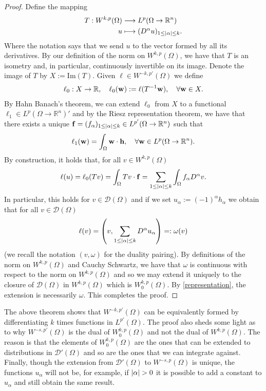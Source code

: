 \documentclass[
    a4paper,
    DIV=14,
    abstract=true,
    numbers=noenddot
]
{scrartcl}
\theoremstyle{definition}
\newcommand{\rm}[1]{\mathrm{#1}}
\newcommand{\R}{\mathbb{R}}
\newcommand{\Dd}{\mathcal{D}}
\begin{document}
\begin{proof}
  Define the mapping
  \begin{align*}
    T: W^{k,p}(\Omega ) & \longrightarrow L^p(\Omega \to \R^n)                \\
    u                   & \longmapsto(D^\alpha u)_{1 \leq\abs{\alpha}\leq k}.
  \end{align*}
  Where the notation says that we send $u$ to the vector formed by all its derivatives. By our definition of the norm on $W^{k,p}(\Omega )$, we have that $T$ is an isometry and, in particular, continuously invertible on its image. Denote the image of $T$ by $X:=\rm{Im}(T)$. Given $\ell \in W^{-k,p'}(\Omega )$ we define
  \begin{align*}
    \ell_0: X \to \R, \quad \ell_0(\vb{w}):= \ell(T^{-1}\vb{w}), \quad \forall \vb{w} \in X.
  \end{align*}
  By Hahn Banach's theorem, we can extend $\ell_0$ from $X$ to a functional $\ell_1 \in  L^p(\Omega \to \R^n)'$ and by the Riesz representation theorem, we have that there exists a unique $\vb{f}=(f_\alpha)_{1\leq \abs{\alpha}\leq k }\in L^{p'}(\Omega \to \R^n)$ such that
  \begin{align*}
    \ell_1(\vb{w})=\int_{\Omega}\vb{w}\cdot \vb{h}, \quad \forall \vb{w} \in L^p(\Omega \to \R^n).
  \end{align*}
  By construction, it holds that, for all $v \in W^{k,p}(\Omega )$
  \begin{align*}
    \ell(u)=\ell_0(Tv)=\int_{\Omega}Tv\cdot \vb{f}=\sum_{1\leq\left| \alpha \right|\leq k}\int_{\Omega}f_\alpha D^\alpha v .
  \end{align*}
  In particular, this holds for $v \in \Dd(\Omega )$ and if we set $u_\alpha:=(-1)^\alpha h_\alpha$ we obtain that for all $v \in \Dd(\Omega )$
  \begin{align}\label{representation}
    \ell(v)=\left(v,\sum_{1\leq\left| \alpha \right|\leq k} D^\alpha u_\alpha\right)=: \omega(v)
  \end{align}
  (we recall the notation $(v,\omega)$ for the duality pairing). By definitions of the norm on $W^{k,p}(\Omega )$ and Cauchy Schwartz, we have that $\omega$ is continuous with respect to the norm on $W^{k,p}(\Omega )$ and so we may extend it uniquely to the closure of $\Dd(\Omega )$ in $W^{k,p}(\Omega )$ which is $W^{k,p}_0(\Omega )$. By \eqref{representation}, the extension is necessarily $\omega$. This completes the proof.
\end{proof}
The above theorem shows that $W^{-k,p'}(\Omega )$ can be equivalently formed by differentiating $k$ times functions in $L^{p'}(\Omega )$. The proof also sheds some light as to why $W^{-s,p'}(\Omega )$ is the dual of $W^{k,p}_0(\Omega )$ and not the dual of $W^{k,p}(\Omega )$. The reason is that the elements of $W^{k,p}_0(\Omega )$ are the ones that can be extended to distributions in $\Dd'(\Omega )$ and so are the ones that we can integrate against. Finally, though the extension from $\Dd'(\Omega )$ to $W^{-s,p}(\Omega )$ is unique, the functions $u_\alpha$ will not be, for example, if $\abs{\alpha}>0$ it is possible to add a constant to $u_\alpha$ and still obtain the same result.
\end{document}
